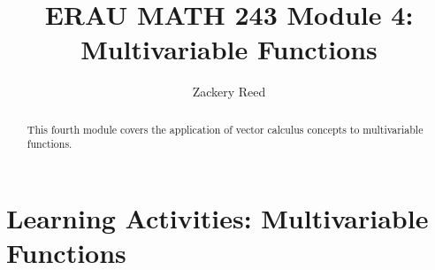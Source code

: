 \documentclass{xourse}
\title{ERAU MATH 243 Module 4: Multivariable Functions}
\author{Zackery Reed}
\begin{document}
\begin{abstract}
This fourth module covers the application of vector calculus concepts to multivariable functions.
\end{abstract}
\maketitle

\part{Learning Activities: Multivariable Functions}
\sectionstyle


\end{document}
